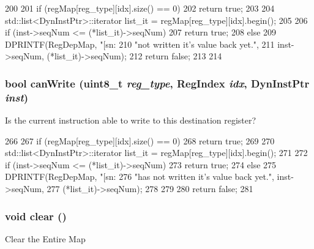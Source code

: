 \begin{DoxyCode}
200 {
201     if (regMap[reg_type][idx].size() == 0)
202         return true;
203 
204     std::list<DynInstPtr>::iterator list_it = regMap[reg_type][idx].begin();
205 
206     if (inst->seqNum <= (*list_it)->seqNum) {
207         return true;
208     } else {
209         DPRINTF(RegDepMap, "[sn:%
210                 "not written it's value back yet.\n",
211                 inst->seqNum, (*list_it)->seqNum);
212         return false;
213     }
214 }
\end{DoxyCode}
\hypertarget{classRegDepMap_a461ac3944ef0b39fb9ef9eb94421ea84}{
\subsubsection[{canWrite}]{\setlength{\rightskip}{0pt plus 5cm}bool canWrite (uint8\_\-t {\em reg\_\-type}, \/  {\bf RegIndex} {\em idx}, \/  {\bf DynInstPtr} {\em inst})}}
\label{classRegDepMap_a461ac3944ef0b39fb9ef9eb94421ea84}
Is the current instruction able to write to this destination register? 


\begin{DoxyCode}
266 {
267     if (regMap[reg_type][idx].size() == 0)
268         return true;
269 
270     std::list<DynInstPtr>::iterator list_it = regMap[reg_type][idx].begin();
271 
272     if (inst->seqNum <= (*list_it)->seqNum) {
273         return true;
274     } else {
275         DPRINTF(RegDepMap, "[sn:%
276                 "has not written it's value back yet.\n", inst->seqNum,
277                 (*list_it)->seqNum);
278     }
279 
280     return false;
281 }
\end{DoxyCode}
\hypertarget{classRegDepMap_ac8bb3912a3ce86b15842e79d0b421204}{
\subsubsection[{clear}]{\setlength{\rightskip}{0pt plus 5cm}void clear ()}}
\label{classRegDepMap_ac8bb3912a3ce86b15842e79d0b421204}
Clear the Entire Map 



